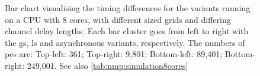 \begin{figure}
    \caption[Bar chart visualising the timing differences for the variants on an 8-core CPU]{Bar chart visualising the timing differences for the variants running on a CPU with 8 cores, with different sized grids and differing channel delay lengths.  Each bar cluster goes from left to right with the \gls{gs}, \gls{ls} and asynchronous variants, respectively.  The numbers of \glspl{pe} are:  Top-left: 361;  Top-right:  9,801;  Bottom-left:  89,401;  Bottom-right:  249,001.  See also \cref{tab:nmp:simulation8cores}}
    \label{fig:nmp:timings8cores}
\end{figure}

